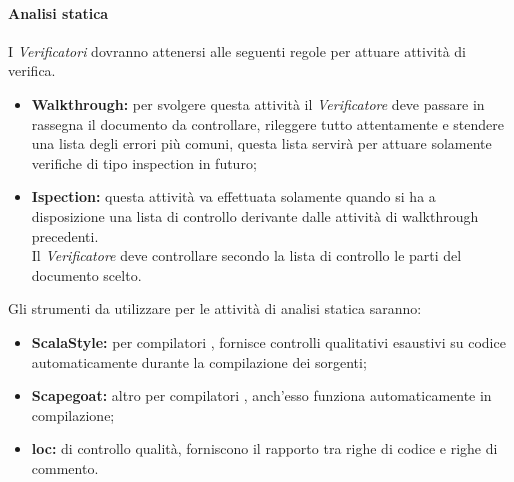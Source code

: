 \documentclass{scalatekids-article}
\begin{document}
\paragraph{Analisi statica}
I \textit{Verificatori} dovranno attenersi alle seguenti regole per attuare attività di verifica.
\begin{itemize}
  \item \textbf{Walkthrough:} per svolgere questa attività il \textit{Verificatore} deve passare in rassegna il documento da controllare, rileggere tutto attentamente e stendere una lista degli errori più comuni, questa lista servirà per attuare solamente verifiche di tipo inspection in futuro;
  \item \textbf{Ispection:} questa attività va effettuata solamente quando si ha a disposizione una lista di controllo derivante dalle attività di walkthrough precedenti.\\
  Il \textit{Verificatore} deve controllare secondo la lista di controllo le parti del documento scelto.
\end{itemize}
Gli strumenti da utilizzare per le attività di analisi statica saranno:
\begin{itemize}
\item\textbf{ScalaStyle:}  per compilatori , fornisce controlli qualitativi esaustivi su codice automaticamente durante la compilazione dei sorgenti;
\item\textbf{Scapegoat:} altro  per compilatori , anch'esso funziona automaticamente in compilazione;
\item\textbf{loc:}  di controllo qualità, forniscono il rapporto tra righe di codice e righe di commento.
\end{itemize}
\end{document}

